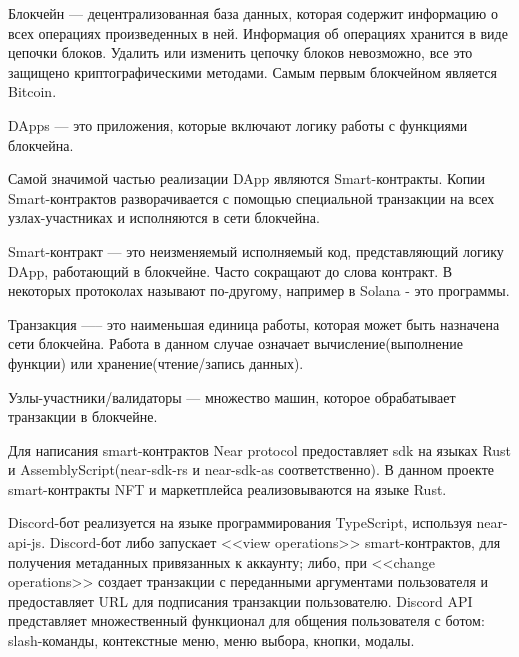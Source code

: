 \begin{definition}
    Блокчейн --- децентрализованная база данных, которая содержит информацию о всех операциях произведенных в ней.
    Информация об операциях хранится в виде цепочки блоков.  Удалить или изменить цепочку блоков невозможно, все это защищено криптографическими методами. Самым первым блокчейном является Bitcoin\cite{nakamoto2012bitcoin}.
\end{definition}

\begin{definition}
    DApps --- это приложения, которые включают логику работы с функциями блокчейна\cite{ramamurthy2020blockchain}.
\end{definition}

Самой значимой частью реализации DApp являются Smart-контракты. Копии Smart-контрактов разворачивается с помощью специальной транзакции на всех узлах-участниках и исполняются в сети блокчейна.

\begin{definition}
    Smart-контракт --- это неизменяемый исполняемый код, представляющий логику DApp, работающий в блокчейне\cite{ramamurthy2020blockchain}. Часто сокращают до слова контракт. В некоторых протоколах называют по-другому, например в Solana - это программы\cite{solanaprogramlibrarydocs}.
\end{definition}

\begin{definition}
    Транзакция —-- это наименьшая единица работы, которая может быть назначена сети блокчейна. Работа в данном случае означает вычисление(выполнение функции) или хранение(чтение/запись данных)\cite{neardocumentationtransaction}.
\end{definition}

\begin{definition}
    Узлы-участники/валидаторы --- множество машин, которое обрабатывает транзакции в блокчейне.
\end{definition}

Для написания smart-контрактов Near protocol предоставляет sdk на языках Rust и AssemblyScript(near-sdk-rs\cite{nearsdkrs} и near-sdk-as\cite{nearsdkas} соответственно). В данном проекте smart-контракты NFT и маркетплейса реализовываются на языке Rust.

Discord-бот реализуется на языке программирования TypeScript, используя near-api-js\cite{nearapijs}. Discord-бот либо запускает <<view operations>> smart-контрактов, для получения метаданных привязанных к аккаунту; либо, при <<change operations>> создает транзакции с переданными аргументами пользователя и предоставляет URL для подписания транзакции пользователю. Discord API представляет множественный функционал для общения пользователя с ботом: slash-команды\cite{discordjsbuttons}, контекстные меню\cite{discordtscontextmenu}, меню выбора\cite{discordjsselectmenus}, кнопки\cite{discordjsbuttons}, модалы\cite{discordjsmodals}.


